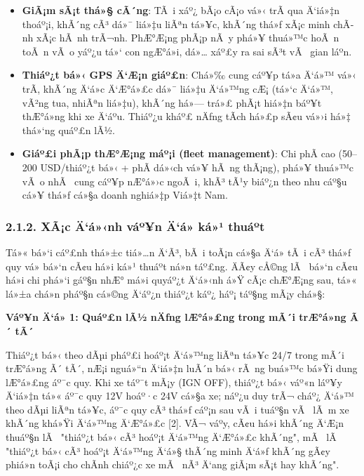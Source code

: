 \documentclass[a4paper]{extarticle}
\providecommand{\tightlist}{%
  \setlength{\itemsep}{0pt}\setlength{\parskip}{0pt}}
\begin{document}
\begin{itemize}
\tightlist
\item
  \textbf{GiÃ¡m sÃ¡t thá»§ cÃ´ng}: TÃ i xáº¿ bÃ¡o cÃ¡o vá»‹ trÃ­ qua Ä‘iá»‡n thoáº¡i,
  khÃ´ng cÃ³ dá»¯ liá»‡u liÃªn tá»¥c, khÃ´ng thá»ƒ xÃ¡c minh chÃ­nh xÃ¡c hÃ nh trÃ¬nh.
  PhÆ°Æ¡ng phÃ¡p nÃ y phá»¥ thuá»™c hoÃ n toÃ n vÃ o yáº¿u tá»‘ con ngÆ°á»i, dá»… xáº£y ra
  sai sÃ³t vÃ  gian láº­n.
\item
  \textbf{Thiáº¿t bá»‹ GPS Ä‘Æ¡n giáº£n}: Chá»‰ cung cáº¥p tá»a Ä‘á»™ vá»‹ trÃ­, khÃ´ng Ä‘á»c
  Ä‘Æ°á»£c dá»¯ liá»‡u Ä‘á»™ng cÆ¡ (tá»‘c Ä‘á»™, vÃ²ng tua, nhiÃªn liá»‡u), khÃ´ng há»— trá»£ phÃ¡t
  hiá»‡n báº¥t thÆ°á»ng khi xe Ä‘áº­u. Thiáº¿u kháº£ nÄƒng tÃ­ch há»£p sÃ¢u vá»›i há»‡ thá»‘ng
  quáº£n lÃ½.
\item
  \textbf{Giáº£i phÃ¡p thÆ°Æ¡ng máº¡i (fleet management)}: Chi phÃ­ cao (50--200
  USD/thiáº¿t bá»‹ + phÃ­ dá»‹ch vá»¥ hÃ ng thÃ¡ng), phá»¥ thuá»™c vÃ o nhÃ  cung cáº¥p
  nÆ°á»›c ngoÃ i, khÃ³ tÃ¹y biáº¿n theo nhu cáº§u cá»¥ thá»ƒ cá»§a doanh nghiá»‡p Viá»‡t
  Nam.
\end{itemize}

\subsubsection{2.1.2. XÃ¡c Ä‘á»‹nh váº¥n Ä‘á» ká»¹
thuáº­t}\label{212-xuxe1c-ux111ux1ecbnh-vux1ea5n-ux111ux1ec1-kux1ef9-thuux1eadt}

Tá»« bá»‘i cáº£nh thá»±c tiá»…n Ä‘Ã³, bÃ i toÃ¡n cá»§a Ä‘á» tÃ i cÃ³ thá»ƒ quy vá» bá»‘n cÃ¢u há»i
ká»¹ thuáº­t ná»n táº£ng. ÄÃ¢y cÅ©ng lÃ  bá»‘n cÃ¢u há»i chi phá»‘i gáº§n nhÆ° má»i quyáº¿t
Ä‘á»‹nh á»Ÿ cÃ¡c chÆ°Æ¡ng sau, tá»« lá»±a chá»n pháº§n cá»©ng Ä‘áº¿n thiáº¿t káº¿ háº¡ táº§ng mÃ¡y
chá»§:

\textbf{Váº¥n Ä‘á» 1: Quáº£n lÃ½ nÄƒng lÆ°á»£ng trong mÃ´i trÆ°á»ng Ã´ tÃ´}

Thiáº¿t bá»‹ theo dÃµi pháº£i hoáº¡t Ä‘á»™ng liÃªn tá»¥c 24/7 trong mÃ´i trÆ°á»ng Ã´ tÃ´,
nÆ¡i nguá»“n Ä‘iá»‡n luÃ´n bá»‹ rÃ ng buá»™c bá»Ÿi dung lÆ°á»£ng áº¯c quy. Khi xe táº¯t mÃ¡y
(IGN OFF), thiáº¿t bá»‹ váº«n láº¥y Ä‘iá»‡n tá»« áº¯c quy 12V hoáº·c 24V cá»§a xe; náº¿u duy
trÃ¬ cháº¿ Ä‘á»™ theo dÃµi liÃªn tá»¥c, áº¯c quy cÃ³ thá»ƒ cáº¡n sau vÃ i tuáº§n vÃ  lÃ m xe
khÃ´ng khá»Ÿi Ä‘á»™ng Ä‘Æ°á»£c {[}2{]}. VÃ¬ váº­y, cÃ¢u há»i khÃ´ng Ä‘Æ¡n thuáº§n lÃ  "thiáº¿t
bá»‹ cÃ³ hoáº¡t Ä‘á»™ng Ä‘Æ°á»£c khÃ´ng", mÃ  lÃ  "thiáº¿t bá»‹ cÃ³ hoáº¡t Ä‘á»™ng Ä‘á»§ thÃ´ng minh
Ä‘á»ƒ khÃ´ng gÃ¢y phiá»n toÃ¡i cho chÃ­nh chiáº¿c xe mÃ  nÃ³ Ä‘ang giÃ¡m sÃ¡t hay
khÃ´ng".
\end{document}
